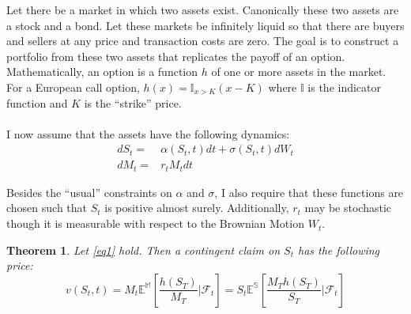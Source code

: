 \documentclass{article}
\newtheorem{theorem}{Theorem}
\begin{document}
Let there be a market in which two assets exist.  Canonically these two assets are a stock and a bond.  Let these markets be infinitely liquid so that there are buyers and sellers at any price and transaction costs are zero.  The goal is to construct a portfolio from these two assets that replicates the payoff of an option.  Mathematically, an option is a function \(h\) of one or more assets in the market.  For a European call option, \(h(x)=\mathbb{I}_{x>K}(x-K)\) where \(\mathbb{I}\) is the indicator function and \(K\) is the ``strike'' price.  
\\
\\
I now assume that the assets have the following dynamics:
\begin{equation}\label{eq1}
\begin{aligned}
dS_t = & \alpha(S_t, t)dt+\sigma(S_t, t)dW_t\\
dM_t = & r_t M_t dt
\end{aligned}
\end{equation}	

Besides the ``usual'' constraints on \(\alpha\) and \(\sigma\), I also require that these functions are chosen such that \(S_t\) is positive almost surely.  Additionally, \(r_t\) may be stochastic though it is measurable with respect to the Brownian Motion \(W_t\).

\begin{theorem}
	Let \ref{eq1} hold.  Then a contingent claim on \(S_t\) has the following price:
	\[v(S_t, t)=M_t\mathbb{E^M}\left[\frac{h(S_T)}{M_T} | \mathcal{F}_t\right]=S_t\mathbb{E^S}\left[\frac{M_T h(S_T)}{S_T}| \mathcal{F}_t \right]\]
	
\end{theorem}
\end{document}
